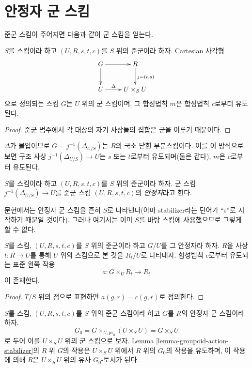 \section{안정자 군 스킴}
\label{section-stabilizer}

\noindent
준군 스킴이 주어지면 다음과 같이 군 스킴을 얻는다.

\begin{lemma}
\label{lemma-groupoid-stabilizer}
$S$를 스킴이라 하고 $(U, R, s, t, c)$를 $S$ 위의 준군이라 하자. Cartesian 사각형
$$
\xymatrix{
G \ar[r] \ar[d] & R \ar[d]^{j = (t, s)} \\
U \ar[r]^-{\Delta} & U \times_S U
}
$$
으로 정의되는 스킴 $G$는 $U$ 위의 군 스킴이며, 그 합성법칙 $m$은 합성법칙 $c$로부터 유도된다.
\end{lemma}

\begin{proof}
준군 범주에서 각 대상의 자기 사상들의 집합은 군을 이루기 때문이다.
\end{proof}

\noindent
$\Delta$가 몰입이므로 $G = j^{-1}(\Delta_{U/S})$는 $R$의 국소 닫힌 부분스킴이다. 이를 이 방식으로 보면 구조 사상
$j^{-1}(\Delta_{U/S}) \to U$는 $s$ 또는 $t$로부터 유도되며(둘은 같다), $m$은 $c$로부터 유도된다.

\begin{definition}
\label{definition-stabilizer-groupoid}
$S$를 스킴이라 하고 $(U, R, s, t, c)$를 $S$ 위의 준군이라 하자. 군 스킴
$j^{-1}(\Delta_{U/S})\to U$를 준군 스킴 $(U, R, s, t, c)$의 {\it 안정자}라고 한다.
\end{definition}

\noindent
문헌에서는 안정자 군 스킴을 흔히 $S$로 나타낸다(아마 stabilizer라는 단어가 ``s''로 시작하기 때문일 것이다).
그러나 여기서는 이미 $S$를 바탕 스킴에 사용했으므로 그렇게 할 수 없다.

\begin{lemma}
\label{lemma-groupoid-action-stabilizer}
$S$를 스킴, $(U, R, s, t, c)$를 $S$ 위의 준군이라 하고 $G/U$를 그 안정자라 하자. $R$을 사상
$t : R \to U$를 통해 $U$ 위의 스킴으로 본 것을 $R_t/U$로 나타내자. 합성법칙 $c$로부터 유도되는 표준 왼쪽 작용
$$
a : G \times_U R_t \longrightarrow R_t
$$
이 존재한다.
\end{lemma}

\begin{proof}
$T/S$ 위의 점으로 표현하면 $a(g, r) = c(g, r)$로 정의한다.
\end{proof}

\begin{lemma}
\label{lemma-groupoid-action-stabilizer-pseudo-torsor}
$S$를 스킴, $(U, R, s, t, c)$를 $S$ 위의 준군 스킴이라 하고 $G$를 $R$의 안정자 군 스킴이라 하자.
$$
G_0 = G \times_{U, \text{pr}_0} (U \times_S U) = G \times_S U
$$
로 두어 이를 $U \times_S U$ 위의 군 스킴으로 보자. Lemma \ref{lemma-groupoid-action-stabilizer}의 $R$ 위 $G$의 작용은
$U \times_S U$ 위에서 $R$ 위의 $G_0$의 작용을 유도하며, 이 작용에 의해 $R$은 $U \times_S U$ 위의 유사 $G_0$-토서가 된다.
\end{lemma}

